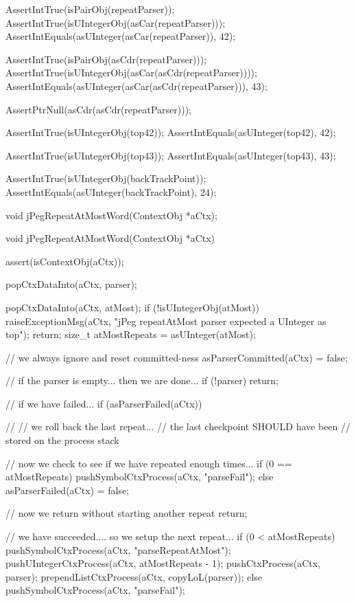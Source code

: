   AssertIntTrue(isPairObj(repeatParser));
  AssertIntTrue(isUIntegerObj(asCar(repeatParser)));
  AssertIntEquals(asUInteger(asCar(repeatParser)), 42);
  
  AssertIntTrue(isPairObj(asCdr(repeatParser)));
  AssertIntTrue(isUIntegerObj(asCar(asCdr(repeatParser))));
  AssertIntEquals(asUInteger(asCar(asCdr(repeatParser))), 43);
  
  AssertPtrNull(asCdr(asCdr(repeatParser)));
  
  AssertIntTrue(isUIntegerObj(top42));
  AssertIntEquals(asUInteger(top42), 42);  

  AssertIntTrue(isUIntegerObj(top43));
  AssertIntEquals(asUInteger(top43), 43);
  
  AssertIntTrue(isUIntegerObj(backTrackPoint));
  AssertIntEquals(asUInteger(backTrackPoint), 24);
\stopCTest
\stopTestCase
\stopTestSuite

\startTestSuite[jPegRepeatAtMostWord]

\startCHeader
void jPegRepeatAtMostWord(ContextObj *aCtx);
\stopCHeader

\startCCode
void jPegRepeatAtMostWord(ContextObj *aCtx) {
  assert(isContextObj(aCtx));

  popCtxDataInto(aCtx, parser);

  popCtxDataInto(aCtx, atMost);
  if (!isUIntegerObj(atMost)) {
    raiseExceptionMsg(aCtx,
      "jPeg repeatAtMost parser expected a UInteger as top");
    return;
  }
  size_t atMostRepeats = asUInteger(atMost);

  // we always ignore and reset committed-ness
  asParserCommitted(aCtx) = false;

  // if the parser is empty... then we are done...
  if (!parser) return;

  // if we have failed...
  if (asParserFailed(aCtx)) {
    //
    // we roll back the last repeat...
    // the last checkpoint SHOULD have been
    // stored on the process stack
    
    // now we check to see if we have repeated enough times...
     if (0 == atMostRepeats) {
       pushSymbolCtxProcess(aCtx, "parseFail");
     } else {
      asParserFailed(aCtx) = false;
     }
    
    // now we return without starting another repeat
    return;
  }
  
  // we have succeeded.... so we setup the next repeat...
  if (0 < atMostRepeats) {
    pushSymbolCtxProcess(aCtx, "parseRepeatAtMost");
    pushUIntegerCtxProcess(aCtx, atMostRepeats - 1);
    pushCtxProcess(aCtx, parser);
    prependListCtxProcess(aCtx, copyLoL(parser));
  } else {
    pushSymbolCtxProcess(aCtx, "parseFail");
  }
}
\stopCCode
{}

